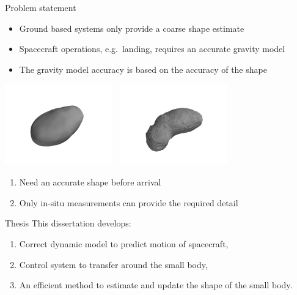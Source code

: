 \begin{frame}[t]{Problem statement}
    \begin{itemize}
        \item Ground based systems only provide a coarse shape estimate
        \item Spacecraft operations, e.g.\ landing, requires an accurate gravity model
        \item The gravity model accuracy is based on the accuracy of the shape
    \end{itemize}

    \begin{center}
    \includegraphics[trim={25cm 15cm 25cm 15cm},clip,width=0.35\textwidth,height=0.5\textheight,keepaspectratio]{figures/mathematical_background/itokawa_radar_isometric.jpg}~
    \includegraphics[trim={25cm 12cm 25cm 15cm},clip,width=0.35\textwidth,height=0.5\textheight,keepaspectratio]{figures/mathematical_background/itokawa_isometric.jpg}
    \end{center}
    \begin{block}{}
        \begin{center}
            \begin{enumerate}
                \item Need an accurate shape before arrival
                \item Only in-situ measurements can provide the required detail
            \end{enumerate}
        \end{center}
    \end{block}
    
\end{frame}

\begin{frame}{Thesis}
    This dissertation develops:
    \begin{enumerate}
        \item Correct dynamic model to predict motion of spacecraft,
        \item Control system to transfer around the small body,
        \item An efficient method to estimate and update the shape of the small body.
    \end{enumerate}
\end{frame}
